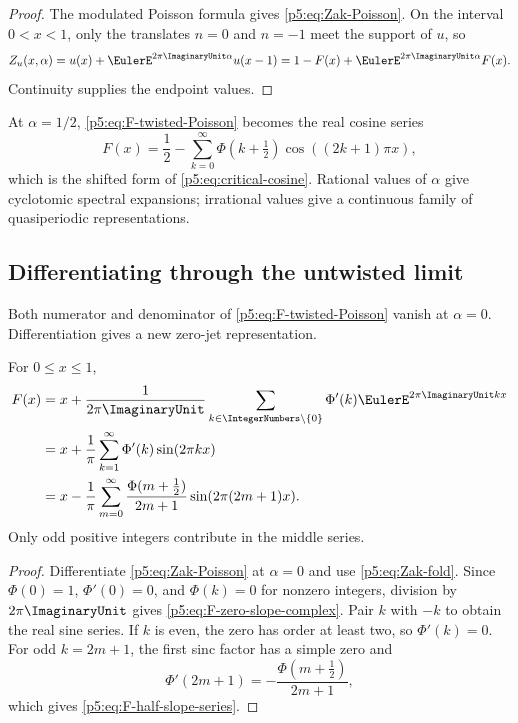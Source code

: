 \documentclass[11pt]{article}
\theoremstyle{definition}
\theoremstyle{remark}
\begin{document}
\begin{proof}
The modulated Poisson formula gives \eqref{p5:eq:Zak-Poisson}.  On the interval
$0<x<1$, only the translates $n=0$ and $n=-1$ meet the support of $u$, so
\[
 Z_u(x,\alpha)=u(x)+\EulerE^{2\pi\ImaginaryUnit\alpha}u(x-1)
 =1-F(x)+\EulerE^{2\pi\ImaginaryUnit\alpha}F(x).
\]
Continuity supplies the endpoint values.
\end{proof}

At $\alpha=1/2$, \eqref{p5:eq:F-twisted-Poisson} becomes the real cosine series
\begin{equation}
 F(x)=\frac12-
 \sum_{k=0}^{\infty}\Phi(k+\tfrac12)
   \cos((2k+1)\pi x),                                     \label{p5:eq:F-half-integer-cosine}
\end{equation}
which is the shifted form of \eqref{p5:eq:critical-cosine}.  Rational values of
$\alpha$ give cyclotomic spectral expansions; irrational values give a
continuous family of quasiperiodic representations.

\subsection{Differentiating through the untwisted limit}

Both numerator and denominator of \eqref{p5:eq:F-twisted-Poisson} vanish at
$\alpha=0$.  Differentiation gives a new zero-jet representation.

\begin{corollary}
\label{p5:cor:zero-slope-F}
For $0\le x\le1$,
\begin{align}
 F(x)
 &=x+\frac1{2\pi\ImaginaryUnit}
   \sum_{k\in\IntegerNumbers\setminus\{0\}}\Phi'(k)\EulerE^{2\pi\ImaginaryUnit kx}    \label{p5:eq:F-zero-slope-complex}\\
 &=x+\frac1\pi\sum_{k=1}^{\infty}\Phi'(k)
   \sin(2\pi kx)                                         \label{p5:eq:F-zero-slope-real}\\
 &=x-\frac1\pi\sum_{m=0}^{\infty}
   \frac{\Phi(m+\tfrac12)}{2m+1}
   \sin(2\pi(2m+1)x).                                    \label{p5:eq:F-half-slope-series}
\end{align}
Only odd positive integers contribute in the middle series.
\end{corollary}

\begin{proof}
Differentiate \eqref{p5:eq:Zak-Poisson} at $\alpha=0$ and use
\eqref{p5:eq:Zak-fold}.  Since $\Phi(0)=1$, $\Phi'(0)=0$, and
$\Phi(k)=0$ for nonzero integers, division by $2\pi\ImaginaryUnit$ gives
\eqref{p5:eq:F-zero-slope-complex}.  Pair $k$ with $-k$ to obtain the real sine
series.  If $k$ is even, the zero has order at least two, so $\Phi'(k)=0$.
For odd $k=2m+1$, the first sinc factor has a simple zero and
\begin{equation}
 \Phi'(2m+1)=-\frac{\Phi(m+\tfrac12)}{2m+1},               \label{p5:eq:odd-zero-slope}
\end{equation}
which gives \eqref{p5:eq:F-half-slope-series}.
\end{proof}
\end{document}
